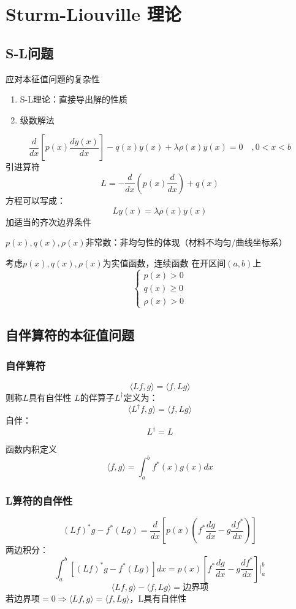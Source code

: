 \newpage
\section{Sturm-Liouville 理论}
\subsection{S-L问题}

\noindent 应对本征值问题的复杂性
\begin{enumerate}
    \item S-L理论：直接导出解的性质
    \item 级数解法
\end{enumerate}

\begin{dfn}[S-L型方程的一般形式]
    $$\frac{d}{dx}\left[p(x)\frac{dy(x)}{dx}\right]-q(x)y(x)+\lambda\rho(x)y(x)=0\quad,0<x<b$$
    引进算符$$L=-\frac{d}{dx}(p(x)\frac{d}{dx})+q(x)$$
    方程可以写成：$$Ly(x)=\lambda\rho(x)y(x)$$
    加适当的齐次边界条件
\end{dfn}

$p(x),q(x),\rho(x)$非常数：非均匀性的体现（材料不均匀/曲线坐标系）

考虑$p(x),q(x),\rho(x)$为实值函数，连续函数
在开区间$(a,b)$上
$$\begin{cases}
p(x)>0\\
q(x)\ge 0\\
\rho(x)>0
\end{cases}$$

\subsection{自伴算符的本征值问题}
\subsubsection{自伴算符}
\begin{dfn}[自伴性]
    $$\langle L f,g\rangle=\langle f,Lg\rangle$$
    则称$L$具有自伴性
    $L$的伴算子$L^\dagger$定义为：
    $$\langle L^\dagger f,g\rangle=\langle f,Lg\rangle$$
    自伴：$$L^\dagger=L$$
\begin{rem}
    函数内积定义$$\langle f,g\rangle=\int_a^bf^*(x)g(x)dx$$
\end{rem}
\end{dfn}
\subsubsection{L算符的自伴性}
$$(Lf)^*g-f^*(Lg)=\frac{d}{dx}\left[p(x)\left(f^*\frac{dg}{dx}-g\frac{df^*}{dx}\right)\right]$$
两边积分：
$$\int_a^b[(Lf)^*g-f^*(Lg)]dx=p(x)\left[f^*\frac{dg}{dx}-g\frac{df^*}{dx}\right]\bigg|_a^b$$
$$\langle Lf,g\rangle-\langle f,Lg\rangle=\text{边界项}$$
若边界项$=0\Rightarrow\langle Lf,g\rangle=\langle f,Lg\rangle$，L具有自伴性

